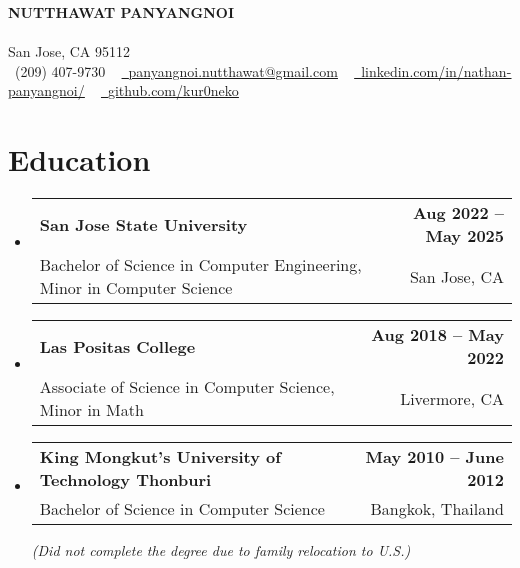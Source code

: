 \documentclass[letterpaper,11pt]{article}
\makeatletter
\newcommand{\resumeSubheading}[4]{
  \vspace{-2pt}\item
    \begin{tabular*}{1.0\textwidth}[t]{l@{\extracolsep{\fill}}r}
      \textbf{#1} & \textbf{\small #2} \\
      {\small#3} & {\small #4} \\
    \end{tabular*}\vspace{-7pt}
}
\newcommand{\resumeSubHeadingListStart}{\begin{itemize}[leftmargin=0.0in, label={}]}
\newcommand{\resumeSubHeadingListEnd}{\end{itemize}}
\makeatother
\begin{document}
\vspace{-10pt}
\begin{center}
    {\Huge \scshape\textbf {NUTTHAWAT PANYANGNOI}}\\ 
    \vspace{1pt}{https://kur0neko.com}\\ \vspace{1pt} 
    \vspace{0.5pt} San Jose, CA 95112 \\ \vspace{0.5pt}
    \small \raisebox{-0.1\height}\faPhone\ (209) 407-9730 ~ \href{mailto:panyangnoi.nutthawat@gmail.com}{\raisebox{-0.2\height}\faEnvelope\  \underline{panyangnoi.nutthawat@gmail.com}} ~ 
    \href{https://www.linkedin.com/in/nathan-panyangnoi/}{\raisebox{-0.2\height}\faLinkedin\ \underline{linkedin.com/in/nathan-panyangnoi/}}  ~
    \href{https://github.com/kur0neko}{\raisebox{-0.2\height}\faGithub\ \underline{github.com/kur0neko}}
    \vspace{-8pt}
\end{center}


\section{Education}
  \resumeSubHeadingListStart
    \resumeSubheading
      {San Jose State University}{Aug 2022 -- May 2025}
      {Bachelor of Science in Computer Engineering, Minor in Computer Science}{San Jose, CA}
      \resumeSubheading
      {Las Positas College}{Aug 2018 -- May 2022}
      {Associate of Science in Computer Science, Minor in Math}{Livermore, CA}
      \resumeSubheading
      {King Mongkut’s University of Technology Thonburi}{May 2010 -- June 2012}
      {Bachelor of Science in Computer Science} {Bangkok, Thailand}
      \newline
      \textit{(Did not complete the degree due to family relocation to U.S.) }
  \resumeSubHeadingListEnd

\end{document}
